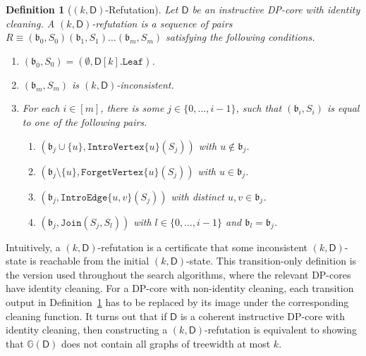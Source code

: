 \documentclass[11pt,a4paper]{article}
\newtheorem{definition}[theorem]{Definition}
\newcommand{\treewidthvalue}{k}
\newcommand{\abag}{\mathfrak{b}}
\newcommand{\introvertextype}[1]{\mathtt{IntroVertex}\{#1\}}
\newcommand{\forgetvertextype}[1]{\mathtt{ForgetVertex}\{#1\}}
\newcommand{\jointype}{\mathtt{Join}}
\newcommand{\introedgegeneric}[2]{\mathtt{IntroEdge}\{#1,#2\}}
\newcommand{\initialsetgeneric}{\mathtt{Leaf}}
\newcommand{\vertexone}{u}
\newcommand{\vertextwo}{v}
\newcommand{\dpcoregraphproperty}[1]{\mathbb{G}(#1)}
\newcommand{\dpcore}{\mathsf{D}}
\newcommand{\witnessset}{S}
\newcommand{\dprefutation}{R}
\begin{document}
\begin{definition}[$(\treewidthvalue,\dpcore)$-Refutation]\label{definition:DPRefutation}
Let $\dpcore$ be an instructive DP-core with identity cleaning. A $(\treewidthvalue,\dpcore)$-refutation is a sequence of pairs
$\dprefutation \equiv (\abag_0,\witnessset_0)(\abag_1,\witnessset_1)\dots (\abag_m,\witnessset_m)$ satisfying the following conditions.
\begin{enumerate}
\setlength\itemsep{0.5em}
\item \label{sequence-relabeling-condition-oneA}
$(\abag_0,\witnessset_0) = (\emptyset,\dpcore[\treewidthvalue].\initialsetgeneric)$.
\item \label{sequence-relabeling-condition-twoA}
$(\abag_m,\witnessset_m)$ is $(\treewidthvalue,\dpcore)$-inconsistent.
\item \label{sequence-relabeling-condition-threeA}
For each $i\in [m]$, there is some $j\in \{0,\dots,i-1\}$, such that $(\abag_i,\witnessset_i)$ is equal to
one of the following pairs.
\begin{enumerate}
\item \label{sequence-IntroVertexA}
$( \abag_j\cup \{\vertexone\}, \introvertextype{\vertexone}(\witnessset_j))$ with $\vertexone\notin \abag_j$.
\item \label{sequence-ForgetVertexA}
$(\abag_j\setminus \{\vertexone\}, \forgetvertextype{\vertexone}(\witnessset_j))$ with $\vertexone\in \abag_j$.
\item \label{sequence-relabelinn-IntroEdgeA}
$(\abag_j, \introedgegeneric{\vertexone}{\vertextwo}(\witnessset_j))$ with distinct $\vertexone,\vertextwo\in \abag_j$.
\item \label{sequence-relabeling-JoinA}
$(\abag_j, \jointype(\witnessset_j,\witnessset_l))$ with $l\in \{0,\dots,i-1\}$ and $\abag_l=\abag_j$.
\end{enumerate}
\end{enumerate}
\end{definition}

Intuitively, a $(\treewidthvalue,\dpcore)$-refutation is a certificate that some inconsistent $(\treewidthvalue,\dpcore)$-state is reachable from the initial $(\treewidthvalue,\dpcore)$-state. This transition-only definition is the version used throughout the search algorithms, where the relevant DP-cores have identity cleaning. For a DP-core with non-identity cleaning, each transition output in Definition~\ref{definition:DPRefutation} has to be replaced by its image under the corresponding cleaning function. It turns out that if $\dpcore$ is a coherent instructive DP-core with identity cleaning, then constructing a $(\treewidthvalue,\dpcore)$-refutation is equivalent to showing that $\dpcoregraphproperty{\dpcore}$ does not contain all graphs of treewidth at most $\treewidthvalue$.
\end{document}
